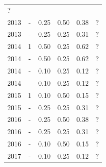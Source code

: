 \begin{table}[H]
\begin{tabular}{| l | c | c | c | c | c |}
          ?
          \\
            2013
          &
          -
          &
          0.25
          &
          0.50
          &
            {\color{red} 0.38}
          &
          ?
          \\
            2013
          &
          -
          &
          0.25
          &
          0.25
          &
            {\color{red} 0.31}
          &
          ?
          \\
\hline
            2014
          &
          1
          &
          0.50
          &
          0.25
          &
            {\color{blue} 0.62}
          &
          ?
          \\
            2014
          &
          -
          &
          0.50
          &
          0.25
          &
            {\color{blue} 0.62}
          &
          ?
          \\
            2014
          &
          -
          &
          0.10
          &
          0.25
          &
            {\color{red} 0.12}
          &
          ?
          \\
            2014
          &
          -
          &
          0.10
          &
          0.25
          &
            {\color{red} 0.12}
          &
          ?
          \\
\hline
            2015
          &
          1
          &
          0.10
          &
          0.50
          &
            {\color{red} 0.15}
          &
          ?
          \\
            2015
          &
          -
          &
          0.25
          &
          0.25
          &
            {\color{red} 0.31}
          &
          ?
          \\
\hline
            2016
          &
          -
          &
          0.25
          &
          0.50
          &
            {\color{red} 0.38}
          &
          ?
          \\
            2016
          &
          -
          &
          0.25
          &
          0.25
          &
            {\color{red} 0.31}
          &
          ?
          \\
            2016
          &
          -
          &
          0.10
          &
          0.50
          &
            {\color{red} 0.15}
          &
          ?
          \\
\hline
            2017
          &
          -
          &
          0.10
          &
          0.25
          &
            {\color{red} 0.12}
          &
          ?
          \\
\hline
\end{tabular}
\end{table}



